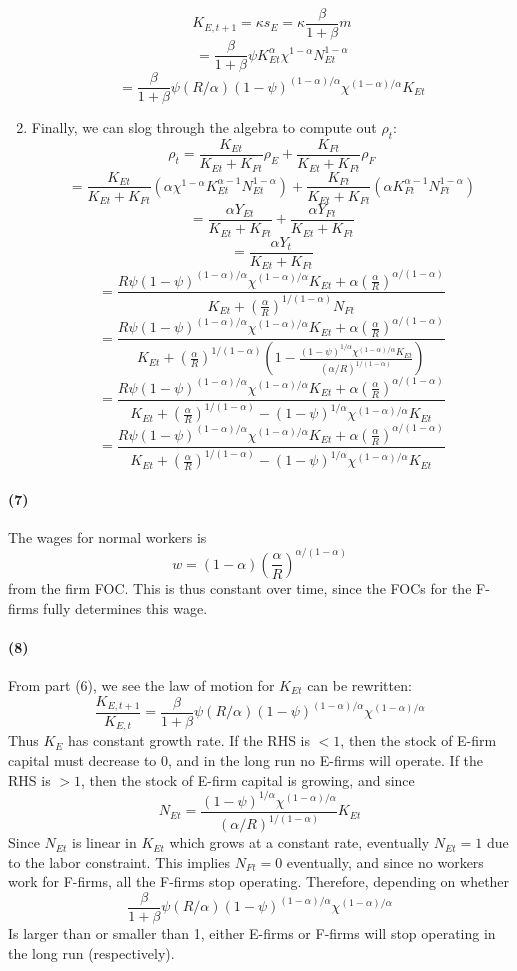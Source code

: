 \documentclass[10pt,letter]{article}
\newcommand{\problempart}[1]{\paragraph{#1}}
\begin{document}
\begin{enumerate}[label=(\roman*)]
\[ K_{E,t+1} = \kappa s_E = \kappa \frac{\beta}{1+\beta} m \]
\[ =  \frac{\beta}{1+\beta} \psi K_{Et}^\alpha \chi^{1-\alpha} N_{Et}^{1-\alpha} \]
\[ = \frac{\beta}{1+\beta} \psi (R/\alpha)(1-\psi)^{(1-\alpha)/\alpha}\chi^{(1-\alpha)/\alpha}K_{Et} \]
\item Finally, we can slog through the algebra to compute out $\rho_t$:
\[ \rho_t = \frac{K_{Et}}{K_{Et} + K_{Ft}}\rho_E + \frac{K_{Ft}}{K_{Et} + K_{Ft}}\rho_F \]
\[ = \frac{K_{Et}}{K_{Et} + K_{Ft}}(\alpha\chi^{1-\alpha}K_{Et}^{\alpha-1}N_{Et}^{1-\alpha}) + \frac{K_{Ft}}{K_{Et} + K_{Ft}}(\alpha K_{Ft}^{\alpha-1}N_{Ft}^{1-\alpha}) \]
\[ = \frac{\alpha Y_{Et}}{K_{Et} + K_{Ft}} + \frac{\alpha Y_{Ft}}{K_{Et} + K_{Ft}} \]
\[ = \frac{\alpha Y_{t}}{K_{Et} + K_{Ft}}  \]
\[ = \frac{R\psi(1-\psi)^{(1-\alpha)/\alpha}\chi^{(1-\alpha)/\alpha}K_{Et}  + \alpha \left(\frac{\alpha}{R}\right)^{\alpha/(1-\alpha)} }{K_{Et} + \left(\frac{\alpha}{R}\right)^{1/(1-\alpha )} N_{Ft}}  \]
\[ = \frac{R\psi(1-\psi)^{(1-\alpha)/\alpha}\chi^{(1-\alpha)/\alpha}K_{Et}  + \alpha \left(\frac{\alpha}{R}\right)^{\alpha/(1-\alpha)} }{K_{Et} + \left(\frac{\alpha}{R}\right)^{1/(1-\alpha )} \left(1 - \frac{(1-\psi)^{1/\alpha}\chi^{(1-\alpha)/\alpha}K_{Et}}{\left(\alpha/R \right)^{1/(1-\alpha)}} \right)}  \]
\[ = \frac{R\psi(1-\psi)^{(1-\alpha)/\alpha}\chi^{(1-\alpha)/\alpha}K_{Et}  + \alpha \left(\frac{\alpha}{R}\right)^{\alpha/(1-\alpha)} }{K_{Et} + \left(\frac{\alpha}{R}\right)^{1/(1-\alpha )} - (1-\psi)^{1/\alpha}\chi^{(1-\alpha)/\alpha}K_{Et}}  \]
\[ = \frac{R\psi(1-\psi)^{(1-\alpha)/\alpha}\chi^{(1-\alpha)/\alpha}K_{Et}  + \alpha \left(\frac{\alpha}{R}\right)^{\alpha/(1-\alpha)} }{K_{Et} + \left(\frac{\alpha}{R}\right)^{1/(1-\alpha )} - (1-\psi)^{1/\alpha}\chi^{(1-\alpha)/\alpha}K_{Et}}  \]
\end{enumerate}
\problempart{(7)}
The wages for normal workers is
\[ w = (1-\alpha) \left(\frac{\alpha}{R} \right)^{\alpha/(1-\alpha)} \]
from the firm FOC. This is thus constant over time, since the FOCs for the F-firms fully determines this wage.
\problempart{(8)}
From part (6), we see the law of motion for $K_{Et}$ can be rewritten:
\[ \frac{K_{E,t+1}}{K_{E,t}} = \frac{\beta}{1+\beta} \psi (R/\alpha)(1-\psi)^{(1-\alpha)/\alpha}\chi^{(1-\alpha)/\alpha} \]
Thus $K_{E}$ has constant growth rate. If the RHS is $< 1$, then the stock of E-firm capital must decrease to 0, and in the long run no E-firms will operate. If the RHS is $>1$, then the stock of E-firm capital is growing, and since
\[ N_{Et} =  \frac{(1-\psi)^{1/\alpha}\chi^{(1-\alpha)/\alpha}}{\left(\alpha/R \right)^{1/(1-\alpha)}}K_{Et} \]
Since $N_{Et}$ is linear in $K_{Et}$ which grows at a constant rate, eventually $N_{Et} = 1$ due to the labor constraint. This implies $N_{Ft} = 0$ eventually, and since no workers work for F-firms, all the F-firms stop operating. Therefore, depending on whether
\[ \frac{\beta}{1+\beta} \psi (R/\alpha)(1-\psi)^{(1-\alpha)/\alpha}\chi^{(1-\alpha)/\alpha}  \]
Is larger than or smaller than 1, either E-firms or F-firms will stop operating in the long run (respectively).
\end{document}
